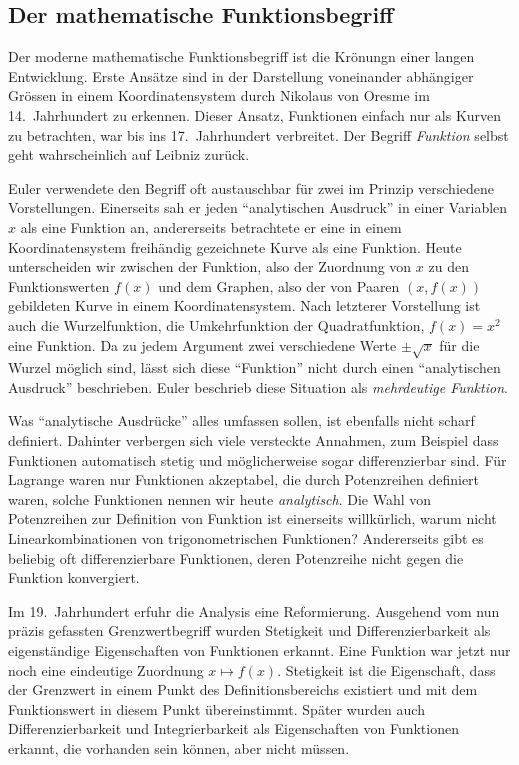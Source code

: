 %
%
\subsection*{Der mathematische Funktionsbegriff}
Der moderne mathematische Funktionsbegriff ist die Krönungn einer
langen Entwicklung.
Erste Ansätze sind in der Darstellung voneinander abhängiger Grössen
in einem Koordinatensystem durch Nikolaus von Oresme im 14.~Jahrhundert
zu erkennen.
Dieser Ansatz, Funktionen einfach nur als Kurven zu betrachten,
war bis ins 17.~Jahrhundert verbreitet.
Der Begriff {\em Funktion} selbst geht wahrscheinlich auf Leibniz
zurück.

Euler verwendete den Begriff oft austauschbar für zwei im Prinzip
verschiedene Vorstellungen.
Einerseits sah er jeden ``analytischen Ausdruck'' in einer Variablen
$x$ als eine Funktion an, andererseits betrachtete er eine in einem
Koordinatensystem freihändig gezeichnete Kurve als eine Funktion.
Heute unterscheiden wir zwischen der Funktion, also der Zuordnung
von $x$ zu den Funktionswerten $f(x)$ und dem Graphen, also der
von Paaren $(x,f(x))$ gebildeten Kurve in einem Koordinatensystem.
Nach letzterer Vorstellung ist auch die Wurzelfunktion,
die Umkehrfunktion der Quadratfunktion, $f(x)=x^2$ eine Funktion.
Da zu jedem Argument zwei verschiedene Werte $\pm\sqrt{x}$
für die Wurzel möglich sind, lässt sich diese ``Funktion'' nicht
durch einen ``analytischen Ausdruck'' beschrieben.
Euler beschrieb diese Situation als {\em mehrdeutige Funktion}.

Was ``analytische Ausdrücke'' alles umfassen sollen, ist ebenfalls
nicht scharf definiert.
Dahinter verbergen sich viele versteckte Annahmen, zum Beispiel
dass Funktionen automatisch stetig und möglicherweise sogar
differenzierbar sind.
Für Lagrange waren nur Funktionen akzeptabel, die durch Potenzreihen
definiert waren, solche Funktionen nennen wir heute {\em analytisch}.
Die Wahl von Potenzreihen zur Definition von Funktion ist einerseits
willkürlich, warum nicht Linearkombinationen von trigonometrischen
Funktionen?
Andererseits gibt es beliebig oft differenzierbare Funktionen,
deren Potenzreihe nicht gegen die Funktion konvergiert.

Im 19.~Jahrhundert erfuhr die Analysis eine Reformierung.
Ausgehend vom nun präzis gefassten Grenzwertbegriff wurden Stetigkeit
und Differenzierbarkeit als eigenständige Eigenschaften von
Funktionen erkannt.
Eine Funktion war jetzt nur noch eine eindeutige Zuordnung
$x\mapsto f(x)$.
Stetigkeit ist die Eigenschaft, dass der Grenzwert in einem
Punkt des Definitionsbereichs existiert und mit dem Funktionswert
in diesem Punkt übereinstimmt. 
Später wurden auch Differenzierbarkeit und Integrierbarkeit als
Eigenschaften von Funktionen erkannt, die vorhanden sein können,
aber nicht müssen.

